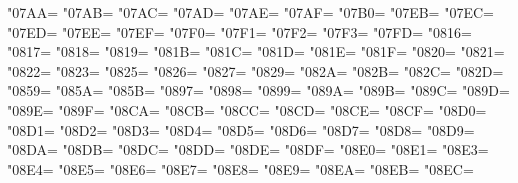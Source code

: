 \XeTeXcharclass"07AA=\KclassCM
\XeTeXcharclass"07AB=\KclassCM
\XeTeXcharclass"07AC=\KclassCM
\XeTeXcharclass"07AD=\KclassCM
\XeTeXcharclass"07AE=\KclassCM
\XeTeXcharclass"07AF=\KclassCM
\XeTeXcharclass"07B0=\KclassCM
\XeTeXcharclass"07EB=\KclassCM
\XeTeXcharclass"07EC=\KclassCM
\XeTeXcharclass"07ED=\KclassCM
\XeTeXcharclass"07EE=\KclassCM
\XeTeXcharclass"07EF=\KclassCM
\XeTeXcharclass"07F0=\KclassCM
\XeTeXcharclass"07F1=\KclassCM
\XeTeXcharclass"07F2=\KclassCM
\XeTeXcharclass"07F3=\KclassCM
\XeTeXcharclass"07FD=\KclassCM
\XeTeXcharclass"0816=\KclassCM
\XeTeXcharclass"0817=\KclassCM
\XeTeXcharclass"0818=\KclassCM
\XeTeXcharclass"0819=\KclassCM
\XeTeXcharclass"081B=\KclassCM
\XeTeXcharclass"081C=\KclassCM
\XeTeXcharclass"081D=\KclassCM
\XeTeXcharclass"081E=\KclassCM
\XeTeXcharclass"081F=\KclassCM
\XeTeXcharclass"0820=\KclassCM
\XeTeXcharclass"0821=\KclassCM
\XeTeXcharclass"0822=\KclassCM
\XeTeXcharclass"0823=\KclassCM
\XeTeXcharclass"0825=\KclassCM
\XeTeXcharclass"0826=\KclassCM
\XeTeXcharclass"0827=\KclassCM
\XeTeXcharclass"0829=\KclassCM
\XeTeXcharclass"082A=\KclassCM
\XeTeXcharclass"082B=\KclassCM
\XeTeXcharclass"082C=\KclassCM
\XeTeXcharclass"082D=\KclassCM
\XeTeXcharclass"0859=\KclassCM
\XeTeXcharclass"085A=\KclassCM
\XeTeXcharclass"085B=\KclassCM
\XeTeXcharclass"0897=\KclassCM
\XeTeXcharclass"0898=\KclassCM
\XeTeXcharclass"0899=\KclassCM
\XeTeXcharclass"089A=\KclassCM
\XeTeXcharclass"089B=\KclassCM
\XeTeXcharclass"089C=\KclassCM
\XeTeXcharclass"089D=\KclassCM
\XeTeXcharclass"089E=\KclassCM
\XeTeXcharclass"089F=\KclassCM
\XeTeXcharclass"08CA=\KclassCM
\XeTeXcharclass"08CB=\KclassCM
\XeTeXcharclass"08CC=\KclassCM
\XeTeXcharclass"08CD=\KclassCM
\XeTeXcharclass"08CE=\KclassCM
\XeTeXcharclass"08CF=\KclassCM
\XeTeXcharclass"08D0=\KclassCM
\XeTeXcharclass"08D1=\KclassCM
\XeTeXcharclass"08D2=\KclassCM
\XeTeXcharclass"08D3=\KclassCM
\XeTeXcharclass"08D4=\KclassCM
\XeTeXcharclass"08D5=\KclassCM
\XeTeXcharclass"08D6=\KclassCM
\XeTeXcharclass"08D7=\KclassCM
\XeTeXcharclass"08D8=\KclassCM
\XeTeXcharclass"08D9=\KclassCM
\XeTeXcharclass"08DA=\KclassCM
\XeTeXcharclass"08DB=\KclassCM
\XeTeXcharclass"08DC=\KclassCM
\XeTeXcharclass"08DD=\KclassCM
\XeTeXcharclass"08DE=\KclassCM
\XeTeXcharclass"08DF=\KclassCM
\XeTeXcharclass"08E0=\KclassCM
\XeTeXcharclass"08E1=\KclassCM
\XeTeXcharclass"08E3=\KclassCM
\XeTeXcharclass"08E4=\KclassCM
\XeTeXcharclass"08E5=\KclassCM
\XeTeXcharclass"08E6=\KclassCM
\XeTeXcharclass"08E7=\KclassCM
\XeTeXcharclass"08E8=\KclassCM
\XeTeXcharclass"08E9=\KclassCM
\XeTeXcharclass"08EA=\KclassCM
\XeTeXcharclass"08EB=\KclassCM
\XeTeXcharclass"08EC=\KclassCM
